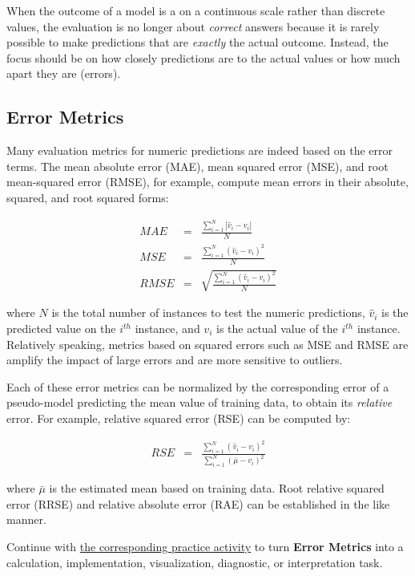 \documentclass[
  letterpaper,
]{scrbook}
\begin{document}
When the outcome of a model is a on a continuous scale rather than
discrete values, the evaluation is no longer about \emph{correct}
answers because it is rarely possible to make predictions that are
\emph{exactly} the actual outcome. Instead, the focus should be on how
closely predictions are to the actual values or how much apart they are
(errors).

\subsection{Error Metrics}\label{error-metrics}

Many evaluation metrics for numeric predictions are indeed based on the
error terms. The mean absolute error (MAE), mean squared error (MSE),
and root mean-squared error (RMSE), for example, compute mean errors in
their absolute, squared, and root squared forms:

\[\begin{aligned}
  MAE & = & \frac{\sum_{i=1}^{N} |\hat{v}_i - v_i|}{N} \\
  MSE & = & \frac{\sum_{i=1}^{N} (\hat{v}_i - v_i)^2}{N} \\
  RMSE & = & \sqrt{\frac{\sum_{i=1}^{N} (\hat{v}_i - v_i)^2}{N}}
\end{aligned}\]

where \(N\) is the total number of instances to test the numeric
predictions, \(\hat{v}_i\) is the predicted value on the \(i^{th}\)
instance, and \(v_i\) is the actual value of the \(i^{th}\) instance.
Relatively speaking, metrics based on squared errors such as MSE and
RMSE are amplify the impact of large errors and are more sensitive to
outliers.

Each of these error metrics can be normalized by the corresponding error
of a pseudo-model predicting the mean value of training data, to obtain
its \emph{relative} error. For example, relative squared error (RSE) can
be computed by:

\[\begin{aligned}
RSE & = & \frac{\sum_{i=1}^{N} (\hat{v}_i - v_i)^2}{\sum_{i=1}^{N} (\bar{\mu} - v_i)^2}
\end{aligned}\]

where \(\bar{\mu}\) is the estimated mean based on training data. Root
relative squared error (RRSE) and relative absolute error (RAE) can be
established in the like manner.

\begin{tcolorbox}[enhanced jigsaw, arc=.35mm, bottomrule=.15mm, bottomtitle=1mm, breakable, colback=white, colbacktitle=quarto-callout-tip-color!10!white, colframe=quarto-callout-tip-color-frame, coltitle=black, left=2mm, leftrule=.75mm, opacityback=0, opacitybacktitle=0.6, rightrule=.15mm, title=\textcolor{quarto-callout-tip-color}{\faLightbulb}\hspace{0.5em}{Put it into practice}, titlerule=0mm, toprule=.15mm, toptitle=1mm]

Continue with \hyperref[sec-pr-14-error-metrics]{the corresponding
practice activity} to turn \textbf{Error Metrics} into a calculation,
implementation, visualization, diagnostic, or interpretation task.

\end{tcolorbox}
\end{document}
